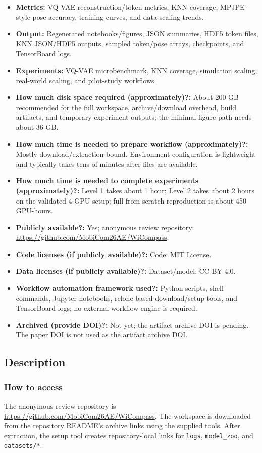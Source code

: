 \documentclass{sigplanconf}
\begin{document}
{\begin{itemize}
\item \textbf{Metrics:} VQ-VAE reconstruction/token metrics, KNN coverage, MPJPE-style pose accuracy, training curves, and data-scaling trends.
\item \textbf{Output:} Regenerated notebooks/figures, JSON summaries, HDF5 token files, KNN JSON/HDF5 outputs, sampled token/pose arrays, checkpoints, and TensorBoard logs.
\item \textbf{Experiments:} VQ-VAE microbenchmark, KNN coverage, simulation scaling, real-world scaling, and pilot-study workflows.
\item \textbf{How much disk space required (approximately)?:} About 200 GB recommended for the full workspace, archive/download overhead, build artifacts, and temporary experiment outputs; the minimal figure path needs about 36 GB.
\item \textbf{How much time is needed to prepare workflow (approximately)?:} Mostly download/extraction-bound. Environment configuration is lightweight and typically takes tens of minutes after files are available.
\item \textbf{How much time is needed to complete experiments (approximately)?:} Level 1 takes about 1 hour; Level 2 takes about 2 hours on the validated 4-GPU setup; full from-scratch reproduction is about 450 GPU-hours.
\item \textbf{Publicly available?:} Yes; anonymous review repository: \url{https://github.com/MobiCom26AE/WiCompass}.
\item \textbf{Code licenses (if publicly available)?:} Code: MIT License.
\item \textbf{Data licenses (if publicly available)?:} Dataset/model: CC BY 4.0.
\item \textbf{Workflow automation framework used?:} Python scripts, shell commands, Jupyter notebooks, rclone-based download/setup tools, and TensorBoard logs; no external workflow engine is required.
\item \textbf{Archived (provide DOI)?:} Not yet; the artifact archive DOI is pending. The paper DOI is not used as the artifact archive DOI.
\end{itemize}}

\subsection{Description}

\subsubsection{How to access}
The anonymous review repository is \url{https://github.com/MobiCom26AE/WiCompass}. The workspace is downloaded from the repository README's archive links using the supplied tools. After extraction, the setup tool creates repository-local links for \texttt{logs}, \texttt{model\_zoo}, and \texttt{datasets/*}.
\end{document}
